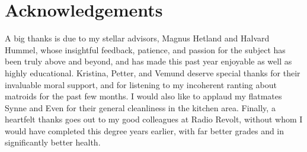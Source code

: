 \documentclass[b5paper]{report}
\begin{document}
\newpage



\chapter*{Acknowledgements}
\thispagestyle{empty}
A big thanks is due to my stellar advisors, Magnus Hetland and Halvard Hummel, whose insightful feedback, patience, and passion for the subject has been truly above and beyond, and has made this past year enjoyable as well as highly educational. Kristina, Petter, and Vemund deserve special thanks for their invaluable moral support, and for listening to my incoherent ranting about matroids for the past few months. I would also like to applaud my flatmates Synne and Even for their general cleanliness in the kitchen area. Finally, a heartfelt thanks goes out to my good colleagues at Radio Revolt, without whom I would have completed this degree years earlier, with far better grades and in significantly better health.






\tableofcontents









\printskelnotes{}
\printbibliography

\begin{appendices}
  
  
  
\end{appendices}
\end{document}
